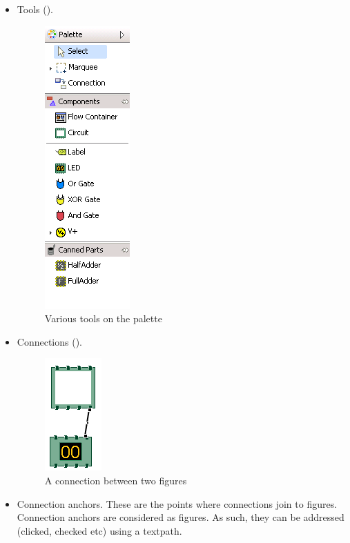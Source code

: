 \begin{itemize}
\item Tools ().

\begin{figure}
\begin{center}
\includegraphics{PS/Tools}
\caption{Various tools on the palette}
\label{tools}
\end{center}
\end{figure}

\item Connections ().

\begin{figure}
\begin{center}
\includegraphics{PS/Connection}
\caption{A connection between two figures}
\label{connection}
\end{center}
\end{figure}

\item Connection anchors. These are the points where connections join to figures. Connection anchors are considered as figures. As such, they can be addressed (clicked, checked etc) using a textpath. 
\end{itemize}

\clearpage
